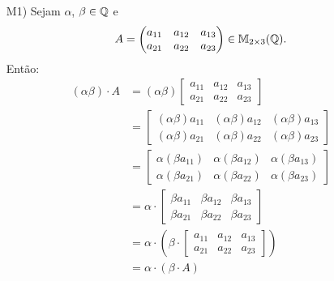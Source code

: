 \begin{exemplo}
\begin{enumerate}[label={\arabic*})]
\begin{solucao}
\begin{itemize}
				      \item[M1)] Sejam $\alpha$, $\beta \in \mathbb{Q}$ e
					      \[
						      A = \begin{pmatrix} a_{11} & a_{12} & a_{13}\\a_{21} & a_{22} & a_{23}\end{pmatrix} \in \mathbb{M}_{2 \times 3}(\mathbb{Q}).
					      \]
					      Então:
					      \begin{align*}
						      (\alpha\beta)\cdot A & = (\alpha\beta)\begin{bmatrix} a_{11} & a_{12} & a_{13}\\a_{21} & a_{22} & a_{23}\end{bmatrix}
						      \\ &=	\begin{bmatrix} (\alpha\beta)a_{11} & (\alpha\beta)a_{12} & (\alpha\beta)a_{13}\\(\alpha\beta)a_{21} & (\alpha\beta)a_{22} & (\alpha\beta)a_{23}\end{bmatrix}
						      \\ &=	\begin{bmatrix} \alpha(\beta a_{11}) & \alpha(\beta a_{12}) & \alpha(\beta a_{13})\\\alpha(\beta a_{21}) & \alpha(\beta a_{22}) & \alpha(\beta a_{23})\end{bmatrix}
						      \\ &=	\alpha\cdot\begin{bmatrix} \beta a_{11} & \beta a_{12} & \beta a_{13}\\\beta a_{21} & \beta a_{22} & \beta a_{23}\end{bmatrix}
						      \\ &=	\alpha\cdot\left(\beta\cdot\begin{bmatrix} a_{11} & a_{12} & a_{13}\\a_{21} & a_{22} & a_{23}\end{bmatrix}\right)
						      \\ &= \alpha\cdot(\beta\cdot A)
					      \end{align*}


\end{itemize}
\end{solucao}
\end{enumerate}
\end{exemplo}
